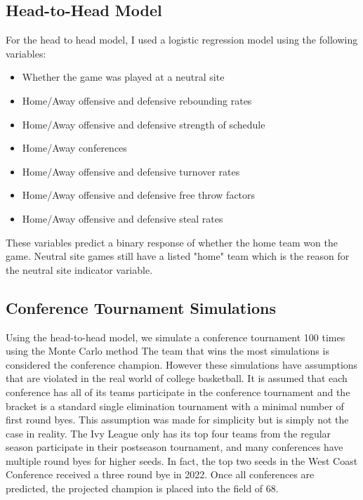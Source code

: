 \documentclass{article}
\begin{document}
\subsection{Head-to-Head Model}

For the head to head model, I used a logistic regression model using the following variables:

\begin{itemize}
	\item Whether the game was played at a neutral site
	\item Home/Away offensive and defensive rebounding rates
	\item Home/Away offensive and defensive strength of schedule
	\item Home/Away conferences
	\item Home/Away offensive and defensive turnover rates
	\item Home/Away offensive and defensive free throw factors
	\item Home/Away offensive and defensive steal rates
\end{itemize}

These variables predict a binary response of whether the home team won the game. Neutral site games still have a listed "home" team which is the reason for the neutral site indicator variable.

\subsection{Conference Tournament Simulations}

Using the head-to-head model, we simulate a conference tournament 100 times using the Monte Carlo method The team that wins the most simulations is considered the conference champion. However these simulations have assumptions that are violated in the real world of college basketball. It is assumed that each conference has all of its teams participate in the conference tournament and the bracket is a standard single elimination tournament with a minimal number of first round byes. This assumption was made for simplicity but is simply not the case in reality. The Ivy League only has its top four teams from the regular season participate in their postseason tournament, and many conferences have multiple round byes for higher seeds. In fact, the top two seeds in the West Coast Conference received a three round bye in 2022. Once all conferences are predicted, the projected champion is placed into the field of 68.
\end{document}
